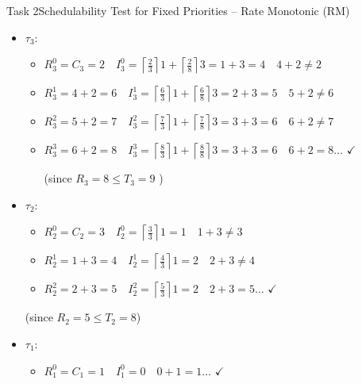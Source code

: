 \begin{frame}[allowframebreaks]{Task 2}{Schedulability Test for Fixed Priorities – Rate Monotonic (RM)}
\begin{solutionnoinc}
\begin{itemize}
      \item $\tau_3:$
      \begin{itemize}
        \item $R_3^0=C_3=2 \quad I_3^0=\left\lceil\frac{2}{3}\right\rceil 1+\left\lceil\frac{2}{8}\right\rceil 3=1+3=4 \quad 4+2 \neq 2$
        \item $R_3^1=4+2=6 \quad I_3^1=\left\lceil\frac{6}{3}\right\rceil 1+\left\lceil\frac{6}{8}\right\rceil 3=2+3=5 \quad 5+2 \neq 6$
        \item $R_3^2=5+2=7 \quad I_3^2=\left\lceil\frac{7}{3}\right\rceil 1+\left\lceil\frac{7}{8}\right\rceil 3=3+3=6 \quad 6+2 \neq 7$
        \item $R_3^3=6+2=8 \quad I_3^3=\left\lceil\frac{8}{3}\right\rceil 1+\left\lceil\frac{8}{8}\right\rceil 3=3+3=6 \quad 6+2=8 \ldots$ $\checkmark$

        (since $R_3=8 \leq T_3=9$ )
      \end{itemize}
    \end{itemize}
  \end{solutionnoinc}
  \begin{solution}
    \begin{itemize}
      \item $\tau_2$:
        \begin{itemize}
          \item $R_2^0=C_2=3 \quad I_2^0=\left\lceil\frac{3}{3}\right\rceil 1=1 \quad 1+3 \neq 3$
          \item $R_2^1=1+3=4 \quad I_2^1=\left\lceil\frac{4}{3}\right\rceil 1=2 \quad 2+3 \neq 4$
          \item $R_2^2=2+3=5 \quad I_2^2=\left\lceil\frac{5}{3}\right\rceil 1=2 \quad 2+3=5 \ldots$ $\checkmark$
        \end{itemize}

          (since $R_2=5 \leq T_2=8$)
      \item $\tau_1$:
        \begin{itemize}
          \item $R_1^0=C_1=1 \quad I_1^0=0 \quad 0+1=1 \ldots$ $\checkmark$
        \end{itemize}


\end{itemize}
\end{solution}
\end{frame}
